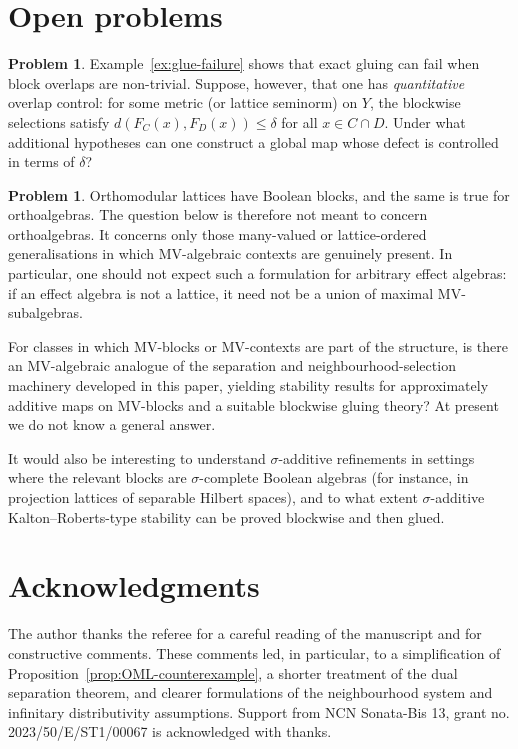 \documentclass[11pt]{amsart}
\theoremstyle{definition}
\newtheorem{problem}[theorem]{Problem}
\begin{document}
\section{Open problems}

\begin{problem}\label{prob:quant-glue}
Example~\ref{ex:glue-failure} shows that exact gluing can fail when block overlaps are non-trivial.
Suppose, however, that one has \emph{quantitative} overlap control: for some metric (or lattice seminorm) on $Y$,
the blockwise selections satisfy $d(F_C(x),F_D(x))\le \delta$ for all $x\in C\cap D$.
Under what additional hypotheses can one construct a global map whose defect is controlled in terms of $\delta$?
\end{problem}

\begin{problem}\label{prob:MV}
Orthomodular lattices have Boolean blocks, and the same is true for orthoalgebras.
The question below is therefore not meant to concern orthoalgebras.
It concerns only those many-valued or lattice-ordered generalisations in which MV-algebraic contexts are genuinely present.
In particular, one should not expect such a formulation for arbitrary effect algebras: if an effect algebra is not a lattice, it need not be a union of maximal MV-subalgebras.

For classes in which MV-blocks or MV-contexts are part of the structure, is there an MV-algebraic analogue of the separation and neighbourhood-selection machinery
developed in this paper, yielding stability results for approximately additive maps on
MV-blocks and a suitable blockwise gluing theory?
At present we do not know a general answer.

It would also be interesting to understand $\sigma$-additive refinements in settings where
the relevant blocks are $\sigma$-complete Boolean algebras (for instance, in projection
lattices of separable Hilbert spaces), and to what extent $\sigma$-additive
Kalton--Roberts-type stability can be proved blockwise and then glued.
\end{problem}


\section*{Acknowledgments}
The author thanks the referee for a careful reading of the manuscript and for constructive comments.
These comments led, in particular, to a simplification of Proposition~\ref{prop:OML-counterexample}, a shorter treatment of the dual separation theorem, and clearer formulations of the neighbourhood system and infinitary distributivity assumptions.
Support from NCN Sonata-Bis 13, grant no. 2023/50/E/ST1/00067 is acknowledged with thanks.
\end{document}
